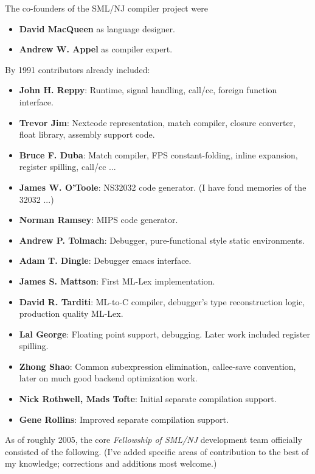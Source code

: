 The co-founders of the SML/NJ compiler project were 
\begin{itemize}
\item {\bf David MacQueen} as language designer.
\item {\bf Andrew W. Appel} as compiler expert.
\end{itemize}

By 1991 contributors already included: 

\begin{itemize}
\item {\bf John H. Reppy}:  Runtime, signal handling, call/cc, foreign function interface.
\item {\bf Trevor Jim}:  Nextcode representation, match compiler, closure converter, float library, assembly support code.
\item {\bf Bruce F. Duba}:  Match compiler, FPS constant-folding, inline expansion, register spilling, call/cc ...
\item {\bf James W. O'Toole}:  NS32032 code generator.  (I have fond memories of the 32032 ...)
\item {\bf Norman Ramsey}:  MIPS code generator.
\item {\bf Andrew P. Tolmach}: Debugger, pure-functional style static environments.
\item {\bf Adam T. Dingle}: Debugger emacs interface.
\item {\bf James S. Mattson}: First ML-Lex implementation.
\item {\bf David R. Tarditi}: ML-to-C compiler, debugger's type reconstruction logic, production quality ML-Lex.
\item {\bf Lal George}: Floating point support, debugging.  Later work included register spilling.
\item {\bf Zhong Shao}: Common subexpression elimination, callee-save convention, later on much good backend optimization work.
\item {\bf Nick Rothwell, Mads Tofte}: Initial separate compilation support.
\item {\bf Gene Rollins}: Improved separate compilation support.
\end{itemize}

As of roughly 2005, the core {\it Fellowship of SML/NJ} development team officially consisted of 
the following.  (I've added specific areas of contribution to the best of my knowledge; corrections 
and additions most welcome.)

